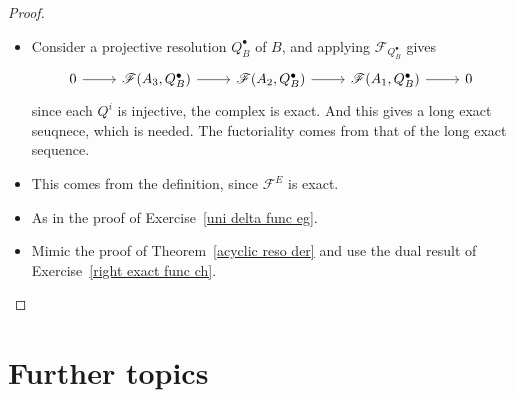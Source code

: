 \begin{proof}
\begin{itemize}
\item Consider a projective resolution $Q^\bullet_B$ of $B$, and applying $\mathscr{F}_{Q_B^\bullet}$ gives
\[\begin{tikzcd}
0\ar[r]&\mathscr{F}(A_3,Q_B^\bullet)\ar[r]&\mathscr{F}(A_2,Q_B^\bullet)\ar[r]&\mathscr{F}(A_1,Q_B^\bullet)\ar[r]&0
\end{tikzcd}\]
since each $Q^i$ is injective, the complex is exact. And this gives a long exact seuqnece, which is needed. The fuctoriality comes from that of the long exact sequence.
\item This comes from the definition, since $\mathscr{F}^E$ is exact.
\item As in the proof of Exercise~\ref{uni delta func eg}.
\item Mimic the proof of Theorem~\ref{acyclic reso der} and use the dual result of Exercise~\ref{right exact func ch}.
\end{itemize}
\end{proof}
\section{Further topics}
